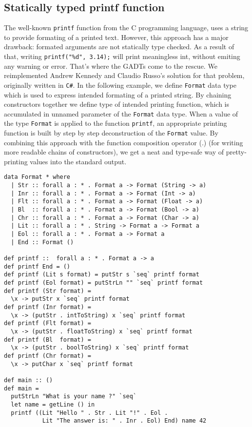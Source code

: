 \documentclass[declaration,shortabstract,english]{iithesis}
\begin{document}
\subsection*{Statically typed printf function}
The well-known \verb+printf+ function from the C programming language,
uses a string to provide formating of a printed text. However, this approach
has a major drawback: formated arguments are not statically type checked.
As a result of that, writing \verb+printf("%d", 3.14);+ will print meaningless int,
without emiting any warning or error. That's where the GADTs come to the rescue.
We reimplemented Andrew Kennedy and Claudio Russo's\cite{gadt-oop} solution for that problem, originally written in \verb+C#+.
In the following example, we define \verb+Format+ data type which is used to express intended formating of a
printed string. By chaining constructors together we define type of intended printing function,
which is accumulated in unnamed parameter of the \verb+Format+ data type. When a value of
the type \verb+Format+ is applied to the function \verb+printf+, an appropriate printing function
is built by step by step deconstruction of the \verb+Format+ value. By combining this approach
with the function composition operator (.) (for writing more readable chains of constructors),
we get a neat and type-safe way of pretty-printing values into the standard output.
\begin{verbatim}
data Format * where
  | Str :: forall a : * . Format a -> Format (String -> a)
  | Inr :: forall a : * . Format a -> Format (Int -> a)
  | Flt :: forall a : * . Format a -> Format (Float -> a)
  | Bl  :: forall a : * . Format a -> Format (Bool -> a)
  | Chr :: forall a : * . Format a -> Format (Char -> a)
  | Lit :: forall a : * . String -> Format a -> Format a
  | Eol :: forall a : * . Format a -> Format a
  | End :: Format ()

def printf ::  forall a : * . Format a -> a
def printf End = ()
def printf (Lit s format) = putStr s `seq` printf format
def printf (Eol format) = putStrLn "" `seq` printf format
def printf (Str format) =
  \x -> putStr x `seq` printf format
def printf (Inr format) =
  \x -> (putStr . intToString) x `seq` printf format
def printf (Flt format) =
  \x -> (putStr . floatToString) x `seq` printf format
def printf (Bl  format) =
  \x -> (putStr . boolToString) x `seq` printf format
def printf (Chr format) =
  \x -> putChar x `seq` printf format

def main :: ()
def main =
  putStrLn "What is your name ?" `seq`
  let name = getLine () in
  printf ((Lit "Hello " . Str . Lit "!" . Eol .
           Lit "The answer is: " . Inr . Eol) End) name 42
\end{verbatim}
\end{document}
